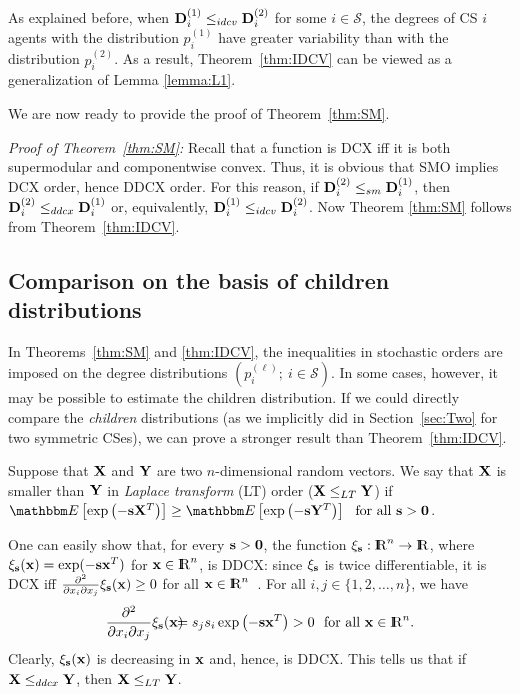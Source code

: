 \documentclass[10pt, journal, compsoc]{IEEEtran}
\newcommand {\cS}{{\mathcal{S}}}
\newcommand {\bX} {{\bf X}}
\newcommand {\bY} {{\bf Y}}
\newcommand {\bs} {{\bf s}}
\newcommand {\bx} {{\bf x}}
\newcommand {\R} {{\rm I\kern-2.5pt R}}
\newcommand{\beqan}{\begin{eqnarray*}}
\newcommand{\eeqan}{\end{eqnarray*}}
\newcommand{\myeq}{& \hspace{-0.1in} = & \hspace{-0.1in}}
\newcommand{\E}[1]{{\mathbbm E}\left[ #1 \right]}
\newcommand{\myskip}{\\ \vspace{-0.1in}}
\begin{document}
As explained before, when ${\bf D}^{(1)}_i 
\leq_{idcv} {\bf D}^{(2)}_i$ for 
some $i \in \cS$, the degrees of CS $i$ agents
with the distribution $p^{(1)}_i$ have greater 
variability than with the distribution $p^{(2)}_i$. 
As a result, Theorem~\ref{thm:IDCV}
can be viewed as a generalization of Lemma
\ref{lemma:L1}.

We are now ready to provide the proof of
Theorem~\ref{thm:SM}. 
\myskip 

\hspace{0.07in} 
{\em Proof of Theorem~\ref{thm:SM}:}
Recall that a function is DCX iff it is both 
supermodular and componentwise convex. Thus, 
it is obvious that SMO implies DCX order, hence
DDCX order. For this reason, if ${\bf D}^{(2)}_i 
\leq_{sm} {\bf D}^{(1)}_i$, then ${\bf D}^{(2)}_i 
\leq_{ddcx} {\bf D}^{(1)}_i$ or, equivalently, 
${\bf D}^{(1)}_i \leq_{idcv} {\bf D}^{(2)}_i$.
Now Theorem
\ref{thm:SM} follows from Theorem~\ref{thm:IDCV}.



\subsection{Comparison on the basis of 
	children distributions}

In Theorems~\ref{thm:SM} and \ref{thm:IDCV}, 
the inequalities in stochastic orders
are imposed on the degree distributions 
$(p^{(\ell)}_i; \ i \in \cS)$. In some cases, 
however, it may be possible to estimate the 
children distribution. If we could directly
compare the {\em children} distributions
(as we implicitly 
did in Section~\ref{sec:Two} for 
two symmetric CSes), we can prove a stronger 
result than Theorem~\ref{thm:IDCV}.

Suppose that $\bX$ and $\bY$ are two 
$n$-dimensional random vectors. We say 
that $\bX$ is smaller than $\bY$ in 
{\em Laplace transform} (LT) order
($\bX \leq_{LT} \bY$) if 
$\E{\exp\left( - \bs \bX^T \right)}
\geq \E{\exp\left( - \bs \bY^T \right)}
\ \mbox{ for all } \bs > {\bf 0}$.

One can easily show that, for every 
$\bs > {\bf 0}$, the function $\xi_{\bs}:
\R^n \to \R$, where
$\xi_{\bs}(\bx) = \exp(- \bs \bx^T)$ 
for $\bx \in \R^n$, is DDCX: since $\xi_{\bs}$
is twice differentiable, it is DCX iff
$\frac{\partial^2}{\partial x_i \partial x_j}
\xi_{\bs}(\bx) \geq 0$ for all $\bx \in 
\R^n$~\cite[Theorem 3.12.2, p. 132]{MullerStoyan}.
For all $i, j \in \{1, 2, \ldots, n\}$, we have 
\beqan
\frac{\partial^2}{\partial x_i \partial x_j}
	\xi_{\bs}(\bx)
\myeq s_j s_i \exp\left( - \bs \bx^T
	\right) > 0 \ \mbox{ for all } 
	\bx \in \R^n.
\eeqan
Clearly, $\xi_{\bs}(\bx)$ is decreasing in 
$\bx$ and, hence, is DDCX. This tells us
that if $\bX \leq_{ddcx} \bY$, then 
$\bX \leq_{LT} \bY$.  
\end{document}
